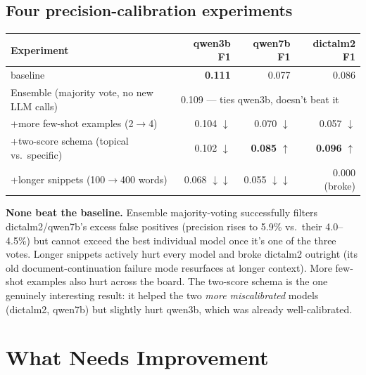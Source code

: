 \documentclass[11pt,a4paper]{article}
\begin{document}
\subsection{Four precision-calibration experiments}
\begin{center}
\small
\begin{tabular}{p{5.2cm}rrr}
\toprule
\textbf{Experiment} & \textbf{qwen3b F1} & \textbf{qwen7b F1} & \textbf{dictalm2 F1} \\
\midrule
baseline & \textbf{0.111} & 0.077 & 0.086 \\
Ensemble (majority vote, no new LLM calls) & \multicolumn{3}{l}{0.109 --- ties qwen3b, doesn't beat it} \\
+more few-shot examples (2$\to$4) & 0.104 $\downarrow$ & 0.070 $\downarrow$ & 0.057 $\downarrow$ \\
+two-score schema (topical vs.\ specific) & 0.102 $\downarrow$ & \textbf{0.085} $\uparrow$ & \textbf{0.096} $\uparrow$ \\
+longer snippets (100$\to$400 words) & 0.068 $\downarrow\downarrow$ & 0.055 $\downarrow\downarrow$ & 0.000 (broke) \\
\bottomrule
\end{tabular}
\end{center}

\textbf{None beat the baseline.} Ensemble majority-voting successfully filters dictalm2/qwen7b's
excess false positives (precision rises to 5.9\% vs.\ their 4.0--4.5\%) but cannot exceed the
best individual model once it's one of the three votes. Longer snippets actively hurt every
model and broke dictalm2 outright (its old document-continuation failure mode resurfaces at
longer context). More few-shot examples also hurt across the board. The two-score schema is the
one genuinely interesting result: it helped the two \emph{more miscalibrated} models
(dictalm2, qwen7b) but slightly hurt qwen3b, which was already well-calibrated.

\section{What Needs Improvement}
\end{document}

